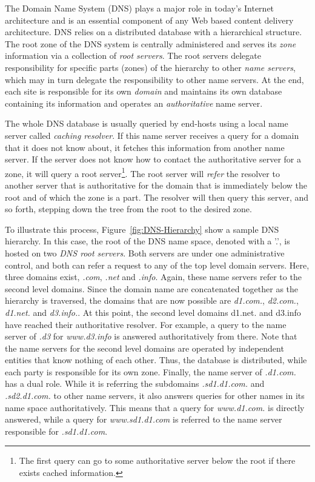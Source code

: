 The Domain Name System (DNS) plays a major role in today's Internet
architecture and is an essential component of any Web based content delivery
architecture.  DNS relies on a distributed database with a hierarchical
structure. The root zone of the DNS system is centrally administered and serves
its {\em zone} information via a collection of {\em root servers}.  The root
servers delegate responsibility for specific parts (zones) of the hierarchy to
other {\em name servers}, which may in turn delegate the responsibility to
other name servers.  At the end, each site is responsible for its own {\em
domain} and maintains its own database containing its information and operates
an {\em authoritative} name server.

The whole DNS database is usually queried by end-hosts using a local name
server called {\em caching resolver}. If this name server receives a query for
a domain that it does not know about, it fetches this information from another
name server. If the server does not know how to contact the authoritative
server for a zone, it will query a root server\footnote{The first query can go
to some authoritative server below the root if there exists cached
information.}. The root server will \emph{refer} the resolver to another server
that is authoritative for the domain that is immediately below the root and of
which the zone is a part. The resolver will then query this server, and so
forth, stepping down the tree from the root to the desired zone.

To illustrate this process, Figure~\ref{fig:DNS-Hierarchy} show a sample DNS
hierarchy. In this case, the root of the DNS name space, denoted with a '.', is
hosted on two \emph{DNS root servers}. Both servers are under one
administrative control, and both can refer a request to any of the top level
domain servers. Here, three domains exist, \ie \textit{.com}, \textit {.net}
and \textit{.info}. Again, these name servers refer to the second level
domains. Since the domain name are concatenated together as the hierarchy is
traversed, the domains that are now possible are \textit {d1.com.}, \textit
{d2.com.}, \textit{d1.net.} and \textit{d3.info.}. At this point, the second
level domains d1.net. and d3.info have reached their authoritative resolver.
For example, a query to the name server of \textit{.d3} for
\textit{www.d3.info} is answered authoritatively from there. Note that the name
servers for the second level domains are operated by independent entities that
know nothing of each other. Thus, the database is distributed, while each party
is responsible for its own zone.  Finally, the name server of \textit{.d1.com.}
has a dual role. While it is referring the subdomains \textit{.sd1.d1.com.} and
\textit{.sd2.d1.com.} to other name servers, it also answers queries for other
names in its name space authoritatively.  This means that a query for
\textit{www.d1.com.} is directly answered, while a query for
\textit{www.sd1.d1.com} is referred to the name server responsible for
\textit{.sd1.d1.com}.

